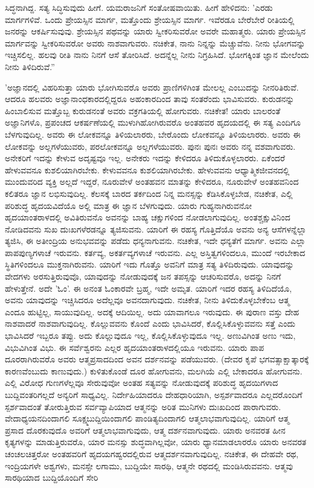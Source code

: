 ಸಿದ್ಧನಾಗಿದ್ದ. ಸತ್ಯ ಸಿದ್ಧಿಸುವುದು ಹೀಗೆ. ಯಮರಾಜನಿಗೆ ಸಂತೋಷವಾಯಿತು. ಹೀಗೆ ಹೇಳಿದನು: 'ಎರಡು ಮಾರ್ಗಗಳಿವೆ. ಒಂದು ಪ್ರೇಯಸ್ಸಿನ ಮಾರ್ಗ, ಮತ್ತೊಂದು ಶ್ರೇಯಸ್ಸಿನ ಮಾರ್ಗ. ಇವೆರಡೂ ಬೇರೆಬೇರೆ ರೀತಿಯಲ್ಲಿ ಜನರನ್ನು ಆಕರ್ಷಿಸುವುವು. ಶ್ರೇಯಸ್ಸಿನ ಪಥವನ್ನು ಯಾರು ಸ್ವೀಕರಿಸುವರೋ ಅವರೇ ಮಹಾತ್ಮರು. ಯಾರು ಪ್ರೇಯಸ್ಸಿನ ಮಾರ್ಗವನ್ನು ಸ್ವೀಕರಿಸುವರೋ ಅವರು ನಾಶವಾಗುವರು. ನಚಿಕೇತ, ನಾನು ನಿನ್ನನ್ನು ಮೆಚ್ಚುವೆನು. ನೀನು ಭೋಗವನ್ನು ಇಚ್ಚಿಸಲಿಲ್ಲ. ಹಲವು ರೀತಿ ನಾನು ನಿನಗೆ ಆಸೆ ತೋರಿಸಿದೆ. ಅದನ್ನೆಲ್ಲ ನೀನು ನಿಗ್ರಹಿಸಿದೆ. ಭೋಗಕ್ಕಿಂತ ಜ್ಞಾನ ಮೇಲೆಂದು ನೀನು ತಿಳಿದಿರುವೆ.”

'ಅಜ್ಞಾನದಲ್ಲಿ ವಿಹರಿಸುತ್ತಾ ಯಾರು ಭೋಗಿಸುವರೊ ಅವರು ಪ್ರಾಣಿಗಳಿಗಿಂತ ಮೇಲಲ್ಲ ಎಂಬುದನ್ನು ನೀನರಿತಿರುವೆ. ಆದರೂ ಹಲವರು ಅಜ್ಞಾನಾಂಧಕಾರದಲ್ಲಿದ್ದರೂ ಅಹಂಕಾರದಿಂದ ತಾವು ಸಂತರೆಂದು ಭಾವಿಸುವರು. ಕುರುಡನನ್ನು ಹಿಂಬಾಲಿಸುವ ಮತ್ತೊಬ್ಬ ಕುರುಡನಂತೆ ಅವರು ವಕ್ರಗತಿಯಲ್ಲಿ ಹೋಗುವರು. ನಚಿಕೇತ! ಯಾರು ಬಾಲರಂತೆ ಅಜ್ಞಾನಿಗಳೊ, ಪ್ರಪಂಚದ ಆಕರ್ಷಣೆಯಲ್ಲಿ ಮುಳುಗಿಹೋಗಿರುವರೊ ಅಂತಹವರ ಹೃದಯದಲ್ಲಿ ಈ ಸತ್ಯ ಎಂದಿಗೂ ಬೆಳಗುವುದಿಲ್ಲ. ಅವರು ಈ ಲೋಕವನ್ನೂ ತಿಳಿಯಲಾರರು, ಬೇರೊಂದು ಲೋಕವನ್ನೂ ತಿಳಿಯಲಾರರು. ಅವರು ಈ ಲೋಕವನ್ನು ಅಲ್ಲಗಳೆಯುವರು, ಪರಲೋಕವನ್ನೂ ಅಲ್ಲಗಳೆಯುವರು. ಪುನಃ ಪುನಃ ಅವರು ನನ್ನ ವಶವಾಗುವರು. ಅನೇಕರಿಗೆ ಇದನ್ನು ಕೇಳುವ ಅದೃಷ್ಟವೂ ಇಲ್ಲ. ಅನೇಕರು ಇದನ್ನು ಕೇಳಿದರೂ ತಿಳಿದುಕೊಳ್ಳಲಾರರು. ಏಕೆಂದರೆ ಹೇಳುವವನೂ ಕುಶಲಿಯಾಗಿರಬೇಕು. ಕೇಳುವವನೂ ಕುಶಲಿಯಾಗಿರಬೇಕು. ಹೇಳುವವನು ಆಧ್ಯಾತ್ಮಿಕ\break ಜೀವನದಲ್ಲಿ ಮುಂದುವರಿದ ವ್ಯಕ್ತಿ ಅಲ್ಲದೆ ಇದ್ದರೆ, ನೂರುವೇಳೆ ಅಂತಹವನ ಮಾತನ್ನು ಕೇಳಿದರೂ, ನೂರುವೇಳೆ ಅಂತಹವನಿಂದ ಕಲಿತರೂ ಜ್ಞಾನ ಲಭಿಸುವುದಿಲ್ಲ. ಕೆಲಸಕ್ಕೆ ಬಾರದ ತರ್ಕದಿಂದ ನಿನ್ನ ಮನಸ್ಸನ್ನು ಕೆಡಿಸಿಕೊಳ್ಳಬೇಡ, ನಚಿಕೇತ, ಎಲ್ಲಿ ಪರಿಶುದ್ಧ ಹೃದಯವಿದೆಯೊ ಅಲ್ಲಿ ಮಾತ್ರ ಈ ಜ್ಞಾನ ಬೆಳಗುವುದು. ಯಾರು ಗುಹ್ಯನಾಗಿರುವನೋ ಹೃದಯಾಂತರಾಳದಲ್ಲಿ ಅವಿತಿರುವನೊ ಅವನನ್ನು ಬಾಹ್ಯ ಚಕ್ಷುಗಳಿಂದ ನೋಡಲಾಗುವುದಿಲ್ಲ. ಅಂತಶ್ಚಕ್ಷುವಿನಿಂದ ನೋಡಿದವನು ಸುಖ ದುಃಖಗಳೆರಡನ್ನೂ ತ್ಯಜಿಸುವನು. ಯಾರಿಗೆ ಈ ರಹಸ್ಯ ಗೊತ್ತಿದೆಯೊ ಅವನು ಅನ್ಯ ಆಸೆಗಳನ್ನೆಲ್ಲಾ ತ್ಯಜಿಸಿ, ಈ ಅತೀಂದ್ರಿಯ ಅನುಭವವನ್ನು ಪಡೆದು ಧನ್ಯನಾಗುವನು. ನಚಿಕೇತ, ಇದೇ ಧನ್ಯತೆಗೆ ಮಾರ್ಗ. ಅವನು ಎಲ್ಲಾ ಪಾಪಪುಣ್ಯಗಳಾಚೆ ಇರುವನು. ಕರ್ತವ್ಯ, ಅಕರ್ತವ್ಯಗಳಾಚೆ ಇರುವನು. ಎಲ್ಲ ಅಸ್ತಿತ್ವಗಳಿಂದಲೂ, ಮುಂದೆ ಇರಬೇಕಾದ ಸ್ಥಿತಿಗಳಿಂದಲೂ ಮುಕ್ತನಾಗಿರುವನು. ಯಾರಿಗೆ ಇದು ಗೊತ್ತೊ ಅವನಿಗೆ ಮಾತ್ರ ಸತ್ಯ ತಿಳಿದಿರುವುದು. ಯಾವುದನ್ನು ವೇದಗಳು ಅರಸುತ್ತಿರುವುವೊ, ಯಾವುದನ್ನು ನೋಡುವುದಕ್ಕೆ ಜನ ತಪಸ್ಸನ್ನು ಆಚರಿಸುವರೊ, ಅದನ್ನು ನಿನಗೆ ಹೇಳುತ್ತೇನೆ. ಅದೇ 'ಓಂ'. ಈ ಅನಂತ ಓಂಕಾರವೇ ಬ್ರಹ್ಮ, ಇದೇ ಅಮೃತ. ಯಾರಿಗೆ ಇದರ ರಹಸ್ಯ ತಿಳಿದಿದೆಯೊ, ಅವನು ಯಾವುದನ್ನು ಇಚ್ಚಿಸಿದರೂ ಅದೆಲ್ಲವೂ ಅವನದಾಗುವುದು. ನಚಿಕೇತ, ನೀನು ತಿಳಿದುಕೊಳ್ಳಬೇಕೆಂಬ ಆತ್ಮ ಎಂದೂ ಹುಟ್ಟಿಲ್ಲ, ಸಾಯುವುದಿಲ್ಲ. ಅದಕ್ಕೆ ಆದಿಯಿಲ್ಲ. ಅದು ಯಾವಾಗಲೂ ಇರುವುದು. ಈ ಪುರಾಣ ವಸ್ತು ದೇಹ ನಾಶವಾದರೆ ನಾಶವಾಗುವುದಿಲ್ಲ. ಕೊಲ್ಲುವವನು ಕೊಂದೆ ಎಂದು ಭಾವಿಸಿದರೆ, ಕೊಲ್ಲಿಸಿಕೊಳ್ಳುವವನು ಸತ್ತೆ ಎಂದು ಭಾವಿಸಿದರೆ ಇಬ್ಬರೂ ತಪ್ಪು. ಅದು ಕೊಲ್ಲುವುದೂ ಇಲ್ಲ, ಕೊಲ್ಲಿಸಿಕೊಳ್ಳುವುದೂ ಇಲ್ಲ. ಅಣುವಿಗಿಂತ ಅಣು ಇದು, ವಿಭುವಿಗಿಂತ ವಿಭು. ಈ ಸರ್ವೆಶ್ವರನು ಎಲ್ಲರ ಹೃದಯಾಂತರಾಳದಲ್ಲಿಯೂ ಇರುವನು. ಯಾರು ಪಾಪ ದೂರರಾಗಿರುವರೊ ಅವರು ಆತ್ಮಪ್ರಸಾದದಿಂದ ಅವನ ದರ್ಶನವನ್ನು ಪಡೆಯುವರು. (ದೇವರ ಕೃಪೆ ಭಗವತ್ಸಾಕ್ಷಾತ್ಕಾರಕ್ಕೆ ಕಾರಣವೆಂಬುದು ಕಾಣುವುದು.) ಕುಳಿತುಕೊಂಡೆ ದೂರ ಹೋಗುವನು, ಮಲಗಿಯೆ ಎಲ್ಲಿ ಬೇಕಾದರೂ ಹೋಗುವನು. ಎಲ್ಲಿ ವಿರೋಧ ಗುಣಗಳೆಲ್ಲವೂ ಸೇರುವುವೋ ಅಂತಹ ಸತ್ಯವನ್ನು ನೋಡುವುದಕ್ಕೆ ಪರಿಶುದ್ಧ ಹೃದಯಿಗಳಾದ ಬುದ್ದಿವಂತರಿಗಲ್ಲದೆ ಅನ್ಯರಿಗೆ ಸಾಧ್ಯವಿಲ್ಲ. ನಿರ್ದೇಹಿಯಾದರೂ ದೇಹಧಾರಿಯಾಗಿ, ಅಸ್ಪರ್ಶವಾದರೂ ಎಲ್ಲದರೊಂದಿಗೆ ಸ್ಪರ್ಶವಾದಂತೆ ತೋರುತ್ತಿರುವ ಸರ್ವವ್ಯಾಪಿಯಾದ ಆತ್ಮನನ್ನು ಅರಿತ ಮುನಿಗಳು ದುಃಖದಿಂದ ಪಾರಾಗುವರು. ವೇದಾಧ್ಯಯನದಿಂದಾಗಲಿ ಸೂಕ್ಷ್ಮಬುದ್ದಿಯಿಂದಾಗಲಿ ಪಾಂಡಿತ್ಯದಿಂದಾಗಲಿ ಆತ್ಮಲಾಭವಾಗುವುದಿಲ್ಲ. ಯಾರಿಗೆ ಆತ್ಮ ಪ್ರಸಾದ ದೊರಕುವುದೊ ಅವರಿಗೆ ಆತ್ಮಲಾಭವಾಗುವುದು, ಆತ್ಮ ದರ್ಶನವಾಗುವುದು. ಯಾರು ಅನವರತ ಹೀನ ಕೃತ್ಯಗಳನ್ನು ಮಾಡುತ್ತಿರುವರೊ, ಯಾರ ಮನಸ್ಸು ಶುದ್ಧವಾಗಿಲ್ಲವೋ, ಯಾರು ಧ್ಯಾನಮಾಡಲಾರರೊ ಯಾರು ಅನವರತ ಚಂಚಲಚಿತ್ತರೋ ಅಂತಹವರಿಗೆ ಹೃದಯಗಹ್ವರದಲ್ಲಿರುವ ಆತ್ಮದರ್ಶನವಾಗುವುದಿಲ್ಲ. ನಚಿಕೇತ, ಈ ದೇಹವೇ ರಥ, ಇಂದ್ರಿಯಗಳೇ ಅಶ್ವಗಳು, ಮನಸ್ಸೇ ಲಗಾಮು, ಬುದ್ದಿಯೇ ಸಾರಥಿ, ಆತ್ಮನೇ ರಥದಲ್ಲಿ ಮಂಡಿಸಿರುವವನು. ಆತ್ಮವು ಸಾರಥಿಯಾದ ಬುದ್ದಿಯೊಂದಿಗೆ ಸೇರಿ 